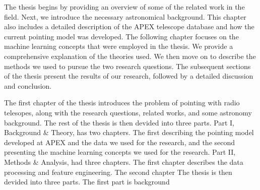 The thesis begins by providing an overview of some of the related work in the field. Next, we introduce the necessary astronomical background.
This chapter also includes a detailed description of the APEX telescope database and how the current pointing model was developed.
The following chapter focuses on the machine learning concepts that were employed in the thesis. We provide a comprehensive explanation of the theories used.
We then move on to describe the methods we used to pursue the two research questions.
The subsequent sections of the thesis present the results of our research, followed by a detailed discussion and conclusion.

The first chapter of the thesis introduces the problem of pointing with radio telesopes, along with the research questions, related works, and some astronomy background.
The rest of the thesis is then devided into three parts. Part I, Background \& Theory, has two chapters. The first describing the pointing model developed at APEX and the data we used for the research,
and the second presenting the machine learning concepts we used for the research.
Part II, Methods & Analysis, had three chapters. The first chapter describes the data processing and feature engineering. The second chapter  
The thesis is then devided into three parts. The first part is background